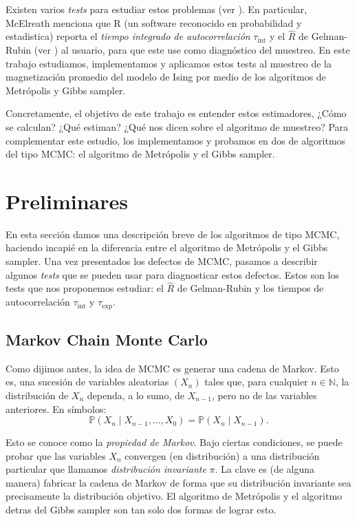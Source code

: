 \documentclass[a4paper, 12pt]{article}
\newcommand{\N}{\mathbb{N}}
\renewcommand{\P}{\mathbb{P}}
\newcommand{\tauint}{\tau_\text{int}}
\newcommand{\tauexp}{\tau_\text{exp}}
\begin{document}
Existen varios {\it tests} para estudiar estos problemas (ver \cite{vivekanada2020convergence, mcelreath2016statistical, schachinger2007mcmc}). En particular, McElreath menciona que R (un software reconocido en probabilidad y estadistica) reporta el {\it tiempo integrado de autocorrelación} $\tauint$ y el $\hat{R}$ de Gelman-Rubin (ver \cite{gelman1992inference, gelman2013bayesian}) al usuario, para que este use como diagnóstico del muestreo. En este trabajo estudiamos, implementamos y aplicamos estos tests al muestreo de la magnetización promedio del modelo de Ising por medio de los algoritmos de Metrópolis y Gibbs sampler.

\newpage

Concretamente, el objetivo de este trabajo es entender estos estimadores, ¿Cómo se calculan? ¿Qué estiman? ¿Qué nos dicen sobre el algoritmo de muestreo? Para complementar este estudio, los implementamos y probamos en dos de algoritmos del tipo MCMC: el algoritmo de Metrópolis y el Gibbs sampler.

\section{Preliminares}

En esta sección damos una descripción breve de los algoritmos de tipo MCMC, haciendo incapié en la diferencia entre el algoritmo de Metrópolis y el Gibbs sampler. Una vez presentados los defectos de MCMC, pasamos a describir algunos {\it tests} que se pueden usar para diagnosticar estos defectos. Estos son los tests que nos proponemos estudiar: el $\hat{R}$ de Gelman-Rubin y los tiempos de autocorrelación $\tauint$ y $\tauexp$.

\subsection{Markov Chain Monte Carlo}

Como dijimos antes, la idea de MCMC es generar una cadena de Markov. Esto es, una sucesión de variables aleatorias $(X_n)$ tales que, para cualquier $n \in \N$, la distribución de $X_n$ dependa, a lo sumo, de $X_{n - 1}$, pero no de las variables anteriores. En símbolos:
\begin{equation*}
    \P(X_n \mid X_{n - 1}, \dots, X_0) = \P(X_n \mid X_{n - 1}).
\end{equation*}

Esto se conoce como la {\it propiedad de Markov}. Bajo ciertas condiciones, se puede probar que las variables $X_n$ convergen (en distribución) a una distribución particular que llamamos {\it distribución invariante} $\pi$. La clave es (de alguna manera) fabricar la cadena de Markov de forma que su distribución invariante sea precisamente la distribución objetivo. El algoritmo de Metrópolis y el algoritmo detras del Gibbs sampler son tan solo dos formas de lograr esto.\\
\end{document}
